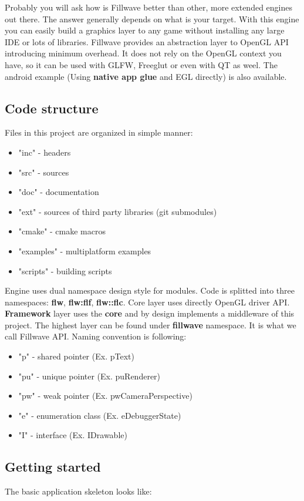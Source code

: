 \documentclass{article}
\begin{document}
Probably you will ask how is Fillwave better than other, more extended engines out there. The answer generally depends on what is your target. With this engine you can easily build a graphics layer to any game without installing any large IDE or lots of libraries. Fillwave provides an abstraction layer to OpenGL API introducing minimum overhead. It does not rely on the OpenGL context you have, so it can be used with GLFW, Freeglut or even with QT as weel. The android example (Using \textbf{native app glue} and EGL directly) is also available.\newpage

\subsection{Code structure}\label{sec:Code structure}
\indent Files in this project are organized in simple manner:
\begin{itemize}
  \item "inc" - headers
  \item "src" - sources
  \item "doc" - documentation
  \item "ext" - sources of third party libraries (git submodules)
  \item "cmake" - cmake macros
  \item "examples" - multiplatform examples
  \item "scripts" - building scripts
\end{itemize}
\indent \indent Engine uses dual namespace design style for modules. Code is splitted into three namespaces: \textbf{flw}, \textbf{flw:flf}, \textbf{flw::flc}. Core layer uses directly OpenGL driver API. \textbf{Framework} layer uses the \textbf{core} and by design implements a middleware of this project. The highest layer can be found under \textbf{fillwave} namespace. It is what we call Fillwave API. Naming convention is following:
\begin{itemize}
  \item "p" - shared pointer (Ex. pText)
  \item "pu" - unique pointer (Ex. puRenderer)
  \item "pw" - weak pointer (Ex. pwCameraPerspective)
  \item "e" - enumeration class (Ex. eDebuggerState)
  \item "I" - interface (Ex. IDrawable)
\end{itemize}

\subsection{Getting started}\label{sec:Getting started}
\indent \indent The basic application skeleton looks like:
\end{document}
